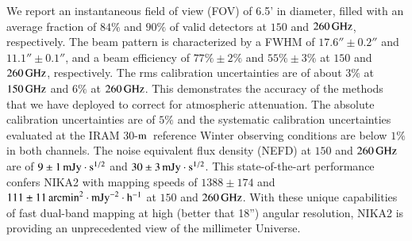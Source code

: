 \documentclass[traditionalabstract]{aa}
\newcommand{\trentemetre}{30-$\rm{m}$}
\newcommand{\lp}[1]{#1}
\begin{document}
       {We report an instantaneous field of view (FOV) of 6.5'
         in diameter, filled with an average fraction of $84\%$ and 
         $90\%$ of %
         valid detectors
         at $150$ and $260\,\rm{GHz}$, respectively. The beam pattern
         is characterized by a FWHM of $17.6'' \pm 0.2''$
         and  $11.1''\pm 0.1''$, and a beam efficiency of
         $77\% \pm 2\%$ and $55\% \pm 3\%$
         at $150$ and $260\,\rm{GHz}$, respectively.
         The rms calibration uncertainties are of about $3\%$ at $150\,\rm{GHz}$ 
         and $6\%$ at $260\,\rm{GHz}$. This demonstrates
         the accuracy of the methods that we have deployed to correct
         for atmospheric attenuation. {\lp The absolute
           calibration uncertainties are of $5\%$ and the systematic
           calibration uncertainties evaluated at the IRAM
           \trentemetre\ reference Winter observing conditions are
           below $1\%$ in both channels.}
         The noise equivalent
         flux density (NEFD) at $150$ and $260\,\rm{GHz}$ are of
         $9 \pm 1\, \rm{mJy}\cdot s^{1/2}$ and
         $30 \pm 3\, \rm{mJy}\cdot s^{1/2}$. 
         This state-of-the-art performance confers NIKA2 with
         mapping speeds of $1388 \pm 174$ and
         $111 \pm 11 \, \rm{arcmin}^2\cdot \rm{mJy}^{-2}\cdot
         \rm{h}^{-1}$
         at $150$ and $260\,\rm{GHz}$.}
       {With these unique capabilities of fast dual-band mapping at
         high (better that 18'') angular resolution, NIKA2 is providing an unprecedented view
         of the millimeter Universe.}      
   \maketitle
\end{document}
